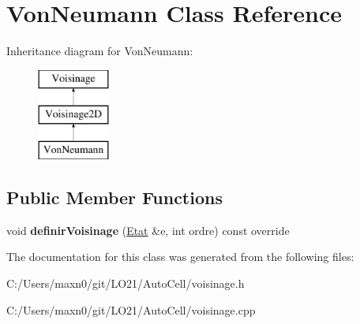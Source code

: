 \hypertarget{class_von_neumann}{}\section{Von\+Neumann Class Reference}
\label{class_von_neumann}
Inheritance diagram for Von\+Neumann\+:\begin{figure}[H]
\begin{center}
\leavevmode
\includegraphics[height=3.000000cm]{class_von_neumann}
\end{center}
\end{figure}
\subsection*{Public Member Functions}
\begin{DoxyCompactItemize}
\item 
\mbox{\label{class_von_neumann_a20b458d41f227a3d39f44e08376b80eb}} 
void {\bfseries definir\+Voisinage} (\mbox{\hyperlink{class_etat}{Etat}} \&e, int ordre) const override
\end{DoxyCompactItemize}


The documentation for this class was generated from the following files\+:\begin{DoxyCompactItemize}
\item 
C\+:/\+Users/maxn0/git/\+L\+O21/\+Auto\+Cell/voisinage.\+h\item 
C\+:/\+Users/maxn0/git/\+L\+O21/\+Auto\+Cell/voisinage.\+cpp\end{DoxyCompactItemize}
